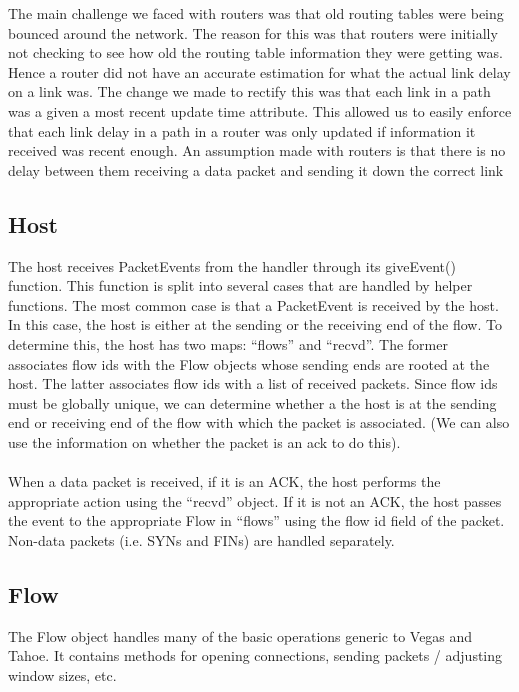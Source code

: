\documentclass[12pt]{article}
\begin{document}
The main challenge we faced with routers was that old routing tables were being bounced around the network. The reason for this was that routers were initially not checking to see how old the routing table information they were getting was. Hence a router did not have an accurate estimation for what the actual link delay on a link was. The change we made to rectify this was that each link in a path was a given a most recent update time attribute. This allowed us to easily enforce that each link delay in a path in a router was only updated if information it received was recent enough. An assumption made with routers is that there is no delay between them receiving a data packet and sending it down the correct link



\subsection{Host}
The host receives PacketEvents from the handler through its giveEvent() function.  This function is split into several cases that are handled by helper functions.  The most common case is that a PacketEvent is received by the host.  In this case, the host is either at the sending or the receiving end of the flow.  To determine this, the host has two maps: ``flows'' and ``recvd''.  The former associates flow ids with the Flow objects whose sending ends are rooted at the host.  The latter associates flow ids with a list of received packets.  Since flow ids must be globally unique, we can determine whether a the host is at the sending end or receiving end of the flow with which the packet is associated.  (We can also use the information on whether the packet is an ack to do this).
\\\\
When a data packet is received, if it is an ACK, the host performs the appropriate action using the ``recvd'' object.  If it is not an ACK, the host passes the event to the appropriate Flow in ``flows'' using the flow id field of the packet.  Non-data packets (i.e. SYNs and FINs) are handled separately.

\subsection{Flow}
The Flow object handles many of the basic operations generic to Vegas and Tahoe.  It contains methods for opening connections, sending packets / adjusting window sizes, etc.
\end{document}
